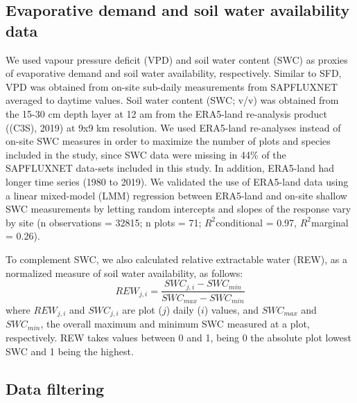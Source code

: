 \documentclass[11pt,twoside]{reedthesis}
\begin{document}
\subsection{Evaporative demand and soil water availability
data}\label{evaporative-demand-and-soil-water-availability-data}

We used vapour pressure deficit (VPD) and soil water content (SWC) as
proxies of evaporative demand and soil water availability, respectively.
Similar to SFD, VPD was obtained from on-site sub-daily measurements
from SAPFLUXNET averaged to daytime values. Soil water content (SWC;
v/v) was obtained from the 15-30 cm depth layer at 12 am from the
ERA5-land re-analysis product ((C3S), 2019) at 9x9 km resolution. We
used ERA5-land re-analyses instead of on-site SWC measures in order to
maximize the number of plots and species included in the study, since
SWC data were missing in 44\% of the SAPFLUXNET data-sets included in
this study. In addition, ERA5-land had longer time series (1980 to
2019). We validated the use of ERA5-land data using a linear mixed-model
(LMM) regression between ERA5-land and on-site shallow SWC measurements
by letting random intercepts and slopes of the response vary by site (n
observations = 32815; n plots = 71; \(R^2\)conditional = 0.97,
\(R^2\)marginal = 0.26).\par

To complement SWC, we also calculated relative extractable water (REW),
as a normalized measure of soil water availability, as follows:
\begin{equation}
REW_{j,i} = \frac{SWC_{j,i} - SWC_{min}}{SWC_{max} - SWC_{min}}
\end{equation}
where \(REW_{j,i}\) and \(SWC_{j,i}\) are plot (\(j\)) daily (\(i\))
values, and \(SWC_{max}\) and \(SWC_{min}\), the overall maximum and
minimum SWC measured at a plot, respectively. REW takes values between 0
and 1, being 0 the absolute plot lowest SWC and 1 being the highest.\par

\subsection{Data filtering}\label{data-filtering}
\end{document}
